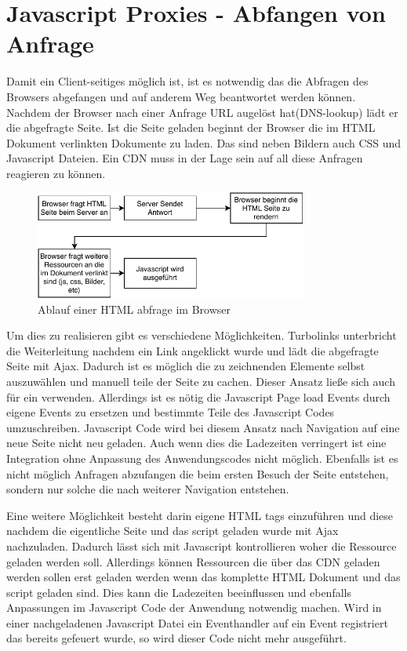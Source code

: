 \section{Javascript Proxies - Abfangen von Anfrage}



Damit ein Client-seitiges \cdn möglich ist, ist es notwendig das die Abfragen des Browsers abgefangen und auf anderem Weg beantwortet werden können. Nachdem der Browser nach einer Anfrage URL augelöst hat(DNS-lookup) lädt er die abgefragte Seite. Ist die Seite geladen beginnt der Browser die im HTML Dokument verlinkten Dokumente zu laden. Das sind neben Bildern auch CSS und Javascript Dateien. Ein CDN muss in der Lage sein auf all diese Anfragen reagieren zu können.

\begin{figure}[!h]
	\centering
	\includegraphics[width=0.8\textwidth]{figures/browser_abfrage}
	\caption[A Figure Short-Title]{Ablauf einer HTML abfrage im Browser}
	\label{fig:browser_abfrage}
\end{figure}


Um dies zu realisieren gibt es verschiedene Möglichkeiten. Turbolinks unterbricht die Weiterleitung nachdem ein Link angeklickt wurde und lädt die abgefragte Seite mit Ajax. Dadurch ist es möglich die zu zeichnenden Elemente selbst auszuwählen und manuell teile der Seite zu cachen. Dieser Ansatz ließe sich auch für ein \cdn verwenden. Allerdings ist es nötig die Javascript Page load Events durch eigene Events zu ersetzen und bestimmte Teile des Javascript Codes umzuschreiben. Javascript Code wird bei diesem Ansatz nach Navigation auf eine neue Seite nicht neu geladen. Auch wenn dies die Ladezeiten verringert ist eine Integration ohne Anpassung des Anwendungscodes nicht möglich. Ebenfalls ist es nicht möglich Anfragen abzufangen die beim ersten Besuch der Seite entstehen, sondern nur solche die nach weiterer Navigation entstehen.

Eine weitere Möglichkeit besteht darin eigene HTML tags einzuführen und diese nachdem die eigentliche Seite und das \cdn script geladen wurde mit Ajax nachzuladen. Dadurch lässt sich mit Javascript kontrollieren woher die Ressource geladen werden soll. Allerdings können Ressourcen die über das \pTp CDN geladen werden sollen erst geladen werden wenn das komplette HTML Dokument und das \cdn script geladen sind. Dies kann die Ladezeiten beeinflussen und ebenfalls Anpassungen im Javascript Code der Anwendung notwendig machen. Wird in einer nachgeladenen Javascript Datei ein Eventhandler auf ein Event registriert das bereits gefeuert wurde, so wird dieser Code nicht mehr ausgeführt. 

